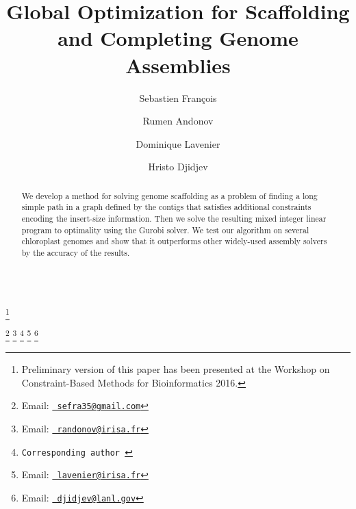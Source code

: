 \documentclass{endmH}
\newcommand{\forLaterVersions}[1]{}
\begin{document}
\begin{verbatim}\end{verbatim}\vspace{2.5cm}

\begin{frontmatter}

\title{Global Optimization for Scaffolding and Completing Genome Assemblies }\thanks{Preliminary version of this paper has been presented at the Workshop on Constraint-Based Methods for Bioinformatics 2016.}

\author{Sebastien Fran\c{c}ois  }
\author{Rumen Andonov }
\author{Dominique Lavenier }
\address{IRISA/INRIA, Rennes, France}

\author{Hristo Djidjev }
\address{Los Alamos National Laboratory,
	Los Alamos, NM 87545, USA }
   \thanks[sebemail]{Email:
   \href{mailto:sefra35@gmail.com} {\texttt{\normalshape
   sefra35@gmail.com}}} 
   \thanks[rumemail]{Email:
   \href{randonov@irisa.fr} {\texttt{\normalshape
   randonov@irisa.fr}}}
   \thanks[Corrresponding]{{\texttt{\normalshape Corresponding author }}} 
   \thanks[domemail]{Email:
   \href{lavenier@irisa.fr} {\texttt{\normalshape
   lavenier@irisa.fr}}}
   \thanks[hriemail]{Email:
   \href{djidjev@lanl.gov} {\texttt{\normalshape
   djidjev@lanl.gov}}}
   

\begin{abstract}
We develop a method for solving genome scaffolding  as a problem of finding a long simple path in a graph defined by the contigs that satisfies additional constraints encoding the insert-size information. Then we solve the resulting mixed integer linear program to optimality using the Gurobi solver. We test our algorithm on several chloroplast genomes and show that it %
outperforms other widely-used assembly solvers by the accuracy of the results.
\end{abstract}

\forLaterVersions
{\begin{keyword}
genome assembly, scaffolding, contig, longest  simple weighted  path problem,
integer programming  
\end{keyword}}

\end{frontmatter}


\label{sec:generalities}
\end{document}
